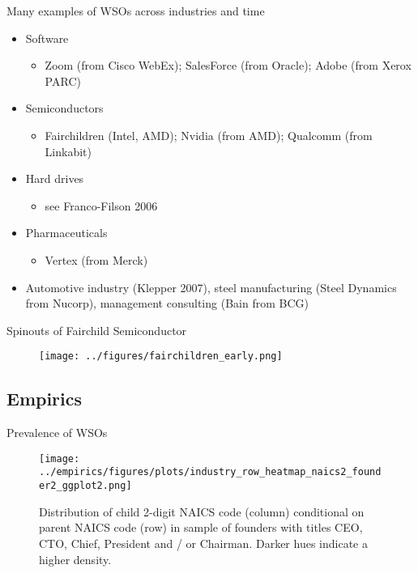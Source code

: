 \documentclass[english,usenames,dvipsnames]{beamer}
\begin{document}
\begin{frame}{Many examples of WSOs across industries and time}\label{spinouts_examples}
	\hyperlink{motivation}{}
	\begin{itemize}
		\item Software
		\begin{itemize}
			\item Zoom (from Cisco WebEx); SalesForce (from Oracle); Adobe (from Xerox PARC)
		\end{itemize}
		\smallskip
		\item Semiconductors
		\begin{itemize}
			\item Fairchildren (Intel, AMD); Nvidia (from AMD); Qualcomm (from Linkabit)
		\end{itemize}
		\smallskip
		\item Hard drives
		\begin{itemize}
			\item see Franco-Filson 2006
		\end{itemize}
		\smallskip
		\item Pharmaceuticals
		\begin{itemize}
			\item Vertex (from Merck)
		\end{itemize}
		\item Automotive industry (Klepper 2007), steel manufacturing (Steel Dynamics from Nucorp), management consulting (Bain from BCG)
	\end{itemize}
\end{frame}


\begin{frame}{Spinouts of Fairchild Semiconductor}\label{fairchildren_early}
\hyperlink{motivation_background}{}
\begin{figure}
	\texttt{[image: ../figures/fairchildren\_early.png]}
\end{figure}
\end{frame}

\subsection{Empirics}

\begin{frame}{Prevalence of WSOs}\label{empirics:wso_heatmap}
	\hyperlink{empirics:constructing_dataset}{}
	\begin{figure}[]
		\centering
		\texttt{[image: ../empirics/figures/plots/industry\_row\_heatmap\_naics2\_founder2\_ggplot2.png]}
		\caption{Distribution of child 2-digit NAICS code (column) conditional on parent NAICS code (row) in sample of founders with titles CEO, CTO, Chief, President and / or Chairman. Darker hues indicate a higher density.}
		\label{figure:industry_row_heatmap_naics2_founder2}
	\end{figure}
\end{frame}
\end{document}

